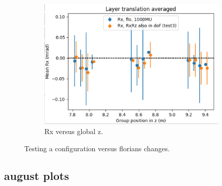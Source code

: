 \begin{figure}
\begin{subfigure}[b]{0.3\textwidth}
    \centering
    \includegraphics[width=\textwidth]{plots/july_28/Rx.png}
    \caption{Rx versus global z.}
  \end{subfigure}
  \caption{Testing a configuration versus florians changes.}
\end{figure}

\subsection{august plots}
